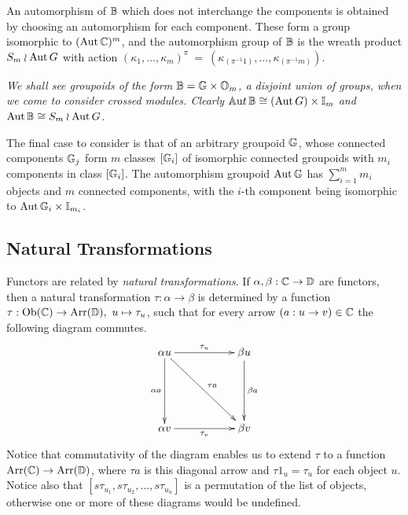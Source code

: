 An automorphism of $\mathbb{B}$ which does not interchange the components 
is obtained by choosing an automorphism for each component.
These form a group isomorphic to $(\mathrm{Aut}\,\mathbb{C})^m$, 
and the automorphism group of $\mathbb{B}$ is the wreath product 
$S_m \wr \mathrm{Aut}\,G$ with action 
$(\kappa_1,\ldots,\kappa_m)^{\pi} ~=~ 
 (\kappa_{(\pi^{-1}1)},\ldots,\kappa_{(\pi^{-1}m)})$. 

\begin{example}
\emph{We shall see groupoids of the form $\mathbb{B} = \mathbb{G} \times \mathbb{O}_m$, 
a disjoint union of groups, when we come to consider crossed modules. 
Clearly $\mathbb{A}{\mathrm ut}\,\mathbb{B} \cong (\mathrm{Aut}\,G) \times \mathbb{I}_m$ 
and $\mathrm{Aut}\,\mathbb{B} \cong S_m \wr \mathrm{Aut}\,G$. 
}\end{example} 

\bigskip 
The final case to consider is that of an arbitrary groupoid $\mathbb{G}$, 
whose connected components $\mathbb{G}_j$ form $m$ classes $[\mathbb{G}_i]$ of 
isomorphic connected groupoids with $m_i$ components in class $[\mathbb{G}_i]$. 
The automorphism groupoid $\mathrm{Aut}\,\mathbb{G}$ has $\sum_{i=1}^m m_i$ objects 
and $m$ connected components, with the $i$-th component being isomorphic 
to $\mathrm{Aut}\,\mathbb{G}_i \times \mathbb{I}_{m_i}$. 


\newpage
\subsection{Natural Transformations}

Functors are related by \emph{natural transformations}. 
  
If $\alpha,\beta : \mathbb{C} \to \mathbb{D}$ are functors, 
then a natural transformation  $\tau : \alpha \to \beta$ 
is determined by a function 
$\tau : \mathrm{Ob}(\mathbb{C}) \to \mathrm{Arr}(\mathbb{D}),~ u \mapsto \tau_u$, 
such that for every arrow $(a : u \to v) \in \mathbb{C}$ 
the following diagram commutes.
$$
\xymatrix{ 
  \alpha u  \ar[rr]^{\tau_u} \ar[dd]_{\alpha a} \ar[ddrr]^{\tau a}
    &&  \beta u \ar[dd]^{\beta a} \\
    &&  \\
  \alpha v  \ar[rr]_{\tau_v} 
    &&  \beta v  \\
}
$$
Notice that commutativity of the diagram enables us to extend $\tau$ 
to a function $\mathrm{Arr}(\mathbb{C}) \to \mathrm{Arr}(\mathbb{D})$, 
where $\tau a$ is this diagonal arrow and 
$\tau 1_u=\tau_u$ for each object $u$. 
Notice also that $[s\tau_{u_1},s\tau_{u_2},\ldots,s\tau_{u_n}]$ 
is a permutation of the list of objects, 
otherwise one or more of these diagrams would be undefined.

